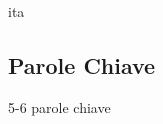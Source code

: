 \markboth{\abstractname}{}
\begin{scontents}[store-env=lang]
ita
\end{scontents}

\begin{scontents}[store-env=abstracts,print-env=true]

\end{scontents}

\subsection*{Parole Chiave}
\begin{scontents}[store-env=keywords,print-env=true]
5-6 parole chiave
\end{scontents}